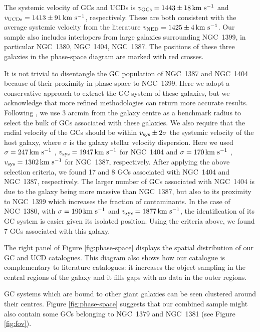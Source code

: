 \documentclass[useAMS,usenatbib]{mn2e}
\newcommand{\kms}{\mbox{\,km~s$^{-1}$}}
\begin{document}
The systemic velocity of GCs and UCDs is $v_{\rm GCs} = 1443 \pm 18 \kms$ and 
$v_{\rm UCDs} = 1413 \pm 91 \kms$, respectively. These are both consistent with 
the average systemic velocity from the literature $v_{\rm NED} = 1425 \pm 4 
\kms$. Our sample also includes interlopers from large galaxies surrounding 
NGC~1399, in particular NGC~1380, NGC~1404, NGC~1387. The positions of these 
three galaxies in the phase-space diagram are marked with red crosses. 

It is not trivial to disentangle the GC population of NGC~1387 and NGC~1404 
because of their proximity in phase-space to NGC~1399. 
Here we adopt a conservative approach to extract the GC system of these 
galaxies, but we acknowledge that more refined methodologies can return more 
accurate results. Following \citet{Schuberth}, we use 3 arcmin from the galaxy 
centre as a benchmark radius to select the bulk of GCs associated with these 
galaxies. We also require that the radial velocity of the GCs should be within 
$v_{\rm sys} \pm 2\sigma$  the systemic velocity of the host galaxy, where 
$\sigma$ is the galaxy stellar velocity dispersion. Here we used $\sigma = 247 
\kms$  \citep{Vanderbeke11}, $v_{\rm sys} = 1947 \kms$ for NGC~1404 and $\sigma 
= 170 \kms$ \citep{Wegner03}, $v_{\rm sys} = 1302\kms $ for NGC~1387, 
respectively. After applying the above selection criteria, we found 17 and 8 
GCs associated with NGC~1404 and NGC~1387, respectively. The larger number of 
GCs associated with NGC~1404 is due to the galaxy being more massive than 
NGC~1387, but also to its proximity to NGC~1399 which increases the fraction of 
contaminants.
In the case of NGC~1380, with $\sigma = 190 \kms$  \citep{Vanderbeke11} and 
$v_{\rm sys} = 1877 \kms$, the identification of its GC system is easier given 
its isolated position. Using the criteria above, we found 7 GCs associated with 
this galaxy. 

The right panel of Figure \ref{fig:phase-space} displays the spatial 
distribution of our GC and UCD catalogues. This diagram also shows how our 
catalogue is complementary to literature catalogues: it increases the object 
sampling in the central regions of the galaxy and it fills gaps with no data in 
the outer regions. 

GC systems which are bound to other giant galaxies can be seen clustered around 
their centres. Figure \ref{fig:phase-space} suggests that our combined sample 
might also contain some GCs belonging to NGC~1379 and NGC~1381 (see Figure 
\ref{fig:fov}). 
\end{document}
